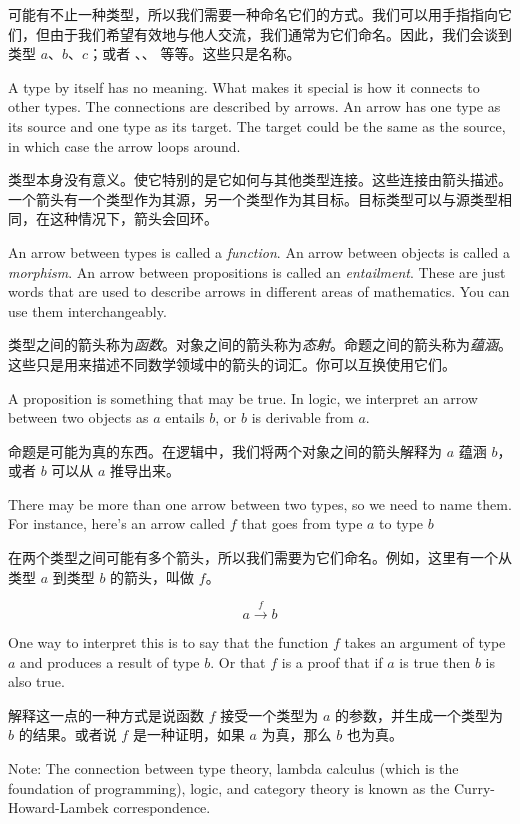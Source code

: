 \documentclass[DaoFP]{subfiles}
\begin{document}
 可能有不止一种类型，所以我们需要一种命名它们的方式。我们可以用手指指向它们，但由于我们希望有效地与他人交流，我们通常为它们命名。因此，我们会谈到类型 $a$、$b$、$c$；或者 、、 等等。这些只是名称。

 A type by itself has no meaning. What makes it special is how it connects to other types. The connections are described by arrows. An arrow has one type as its source and one type as its target. The target could be the same as the source, in which case the arrow loops around.

 类型本身没有意义。使它特别的是它如何与其他类型连接。这些连接由箭头描述。一个箭头有一个类型作为其源，另一个类型作为其目标。目标类型可以与源类型相同，在这种情况下，箭头会回环。

 An arrow between types is called a \emph{function}. An arrow between objects is called a \emph{morphism}. An arrow between propositions is called an \emph{entailment}. These are just words that are used to describe arrows in different areas of mathematics. You can use them interchangeably.

 类型之间的箭头称为\emph{函数}。对象之间的箭头称为\emph{态射}。命题之间的箭头称为\emph{蕴涵}。这些只是用来描述不同数学领域中的箭头的词汇。你可以互换使用它们。

 A proposition is something that may be true. In logic, we interpret an arrow between two objects as $a$ entails $b$, or $b$ is derivable from $a$.

 命题是可能为真的东西。在逻辑中，我们将两个对象之间的箭头解释为 $a$ 蕴涵 $b$，或者 $b$ 可以从 $a$ 推导出来。

 There may be more than one arrow between two types, so we need to name them. For instance, here's an arrow called $f$ that goes from type $a$ to type $b$

 在两个类型之间可能有多个箭头，所以我们需要为它们命名。例如，这里有一个从类型 $a$ 到类型 $b$ 的箭头，叫做 $f$。

 \[ a \xrightarrow f b \]

 One way to interpret this is to say that the function $ f$ takes an argument of type $a$ and produces a result of type $b$. Or that $ f$ is a proof that if $a$ is true then $b$ is also true.

 解释这一点的一种方式是说函数 $f$ 接受一个类型为 $a$ 的参数，并生成一个类型为 $b$ 的结果。或者说 $f$ 是一种证明，如果 $a$ 为真，那么 $b$ 也为真。

 Note: The connection between type theory, lambda calculus (which is the foundation of programming), logic, and category theory is known as the Curry-Howard-Lambek correspondence.
\end{document}
